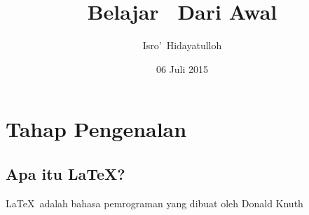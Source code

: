 \documentclass[12pt]{book}
\title{Belajar \LaTeXe\ Dari Awal}
\author{Isro\rq\ Hidayatulloh}
\date{06 Juli 2015}
\begin{document}
\renewcommand{\contentsname}{Daftar Isi}
\renewcommand{\chaptername}{BAB}
\renewcommand{\figurename}{Gambar}
\renewcommand{\tablename}{Tabel}
\renewcommand{\bibname}{Daftar Pustaka}
\renewcommand{\listtablename}{Daftar Tabel}
\renewcommand{\listfigurename}{Daftar Gambar}
\setcounter{secnumdepth}{3}
\maketitle
\newpage

\chapter{Tahap Pengenalan}

\section{Apa itu \LaTeX?}
\LaTeX\ adalah bahasa pemrograman yang dibuat oleh Donald Knuth
\end{document}
